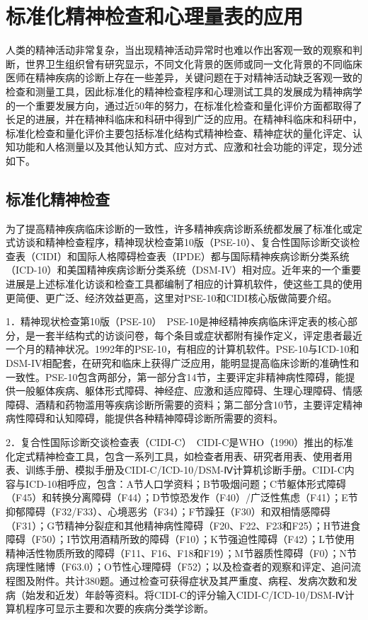 \section{标准化精神检查和心理量表的应用}

人类的精神活动非常复杂，当出现精神活动异常时也难以作出客观一致的观察和判断，世界卫生组织曾有研究显示，不同文化背景的医师或同一文化背景的不同临床医师在精神疾病的诊断上存在一些差异，关键问题在于对精神活动缺乏客观一致的检查和测量工具，因此标准化的精神检查程序和心理测试工具的发展成为精神病学的一个重要发展方向，通过近50年的努力，在标准化检查和量化评价方面都取得了长足的进展，并在精神科临床和科研中得到广泛的应用。在精神科临床和科研中，标准化检查和量化评价主要包括标准化结构式精神检查、精神症状的量化评定、认知功能和人格测量以及其他认知方式、应对方式、应激和社会功能的评定，现分述如下。

\subsection{标准化精神检查}

为了提高精神疾病临床诊断的一致性，许多精神疾病诊断系统都发展了标准化或定式访谈和精神检查程序，精神现状检查第10版（PSE-10）、复合性国际诊断交谈检查表（CIDI）和国际人格障碍检查表（IPDE）都与国际精神疾病诊断分类系统（ICD-10）和美国精神疾病诊断分类系统（DSM-IV）相对应。近年来的一个重要进展是上述标准化访谈和检查工具都编制了相应的计算机软件，使这些工具的使用更简便、更广泛、经济效益更高，这里对PSE-10和CIDI核心版做简要介绍。

1．精神现状检查第10版（PSE-10）　PSE-10是神经精神疾病临床评定表的核心部分，是一套半结构式的访谈问卷，每个条目或症状都附有操作定义，评定患者最近一个月的精神状况。1992年的PSE-10，有相应的计算机软件。PSE-10与ICD-10和DSM-IV相配套，在研究和临床上获得广泛应用，能明显提高临床诊断的准确性和一致性。PSE-10包含两部分，第一部分含14节，主要评定非精神病性障碍，能提供一般躯体疾病、躯体形式障碍、神经症、应激和适应障碍、生理心理障碍、情感障碍、酒精和药物滥用等疾病诊断所需要的资料；第二部分含10节，主要评定精神病性障碍和认知障碍，能提供各种精神障碍诊断所需要的资料。

2．复合性国际诊断交谈检查表（CIDI-C）　CIDI-C是WHO（1990）推出的标准化定式精神检查工具，包含一系列工具，如检查者用表、研究者用表、使用者用表、训练手册、模拟手册及CIDI-C/ICD-10/DSM-Ⅳ计算机诊断手册。CIDI-C内容与ICD-10相呼应，包含：A节人口学资料；B节吸烟问题；C节躯体形式障碍（F45）和转换分离障碍（F44）；D节惊恐发作（F40）/广泛性焦虑（F41）；E节抑郁障碍（F32/F33）、心境恶劣（F34）；F节躁狂（F30）和双相情感障碍（F31）；G节精神分裂症和其他精神病性障碍（F20、F22、F23和F25）；H节进食障碍（F50）；I节饮用酒精所致的障碍（F10）；K节强迫性障碍（F42）；L节使用精神活性物质所致的障碍（F11、F16、F18和F19）；M节器质性障碍（F0）；N节病理性赌博（F63.0）；O节性心理障碍（F52）；以及检查者的观察和评定、追问流程图及附件。共计380题。通过检查可获得症状及其严重度、病程、发病次数和发病（始发和近发）年龄等资料。将CIDI-C的评分输入CIDI-C/ICD-10/DSM-Ⅳ计算机程序可显示主要和次要的疾病分类学诊断。

